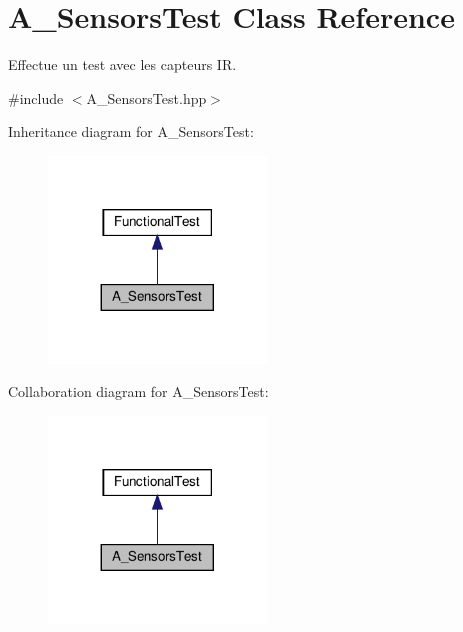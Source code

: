 \hypertarget{classA__SensorsTest}{}\section{A\+\_\+\+Sensors\+Test Class Reference}
\label{classA__SensorsTest}


Effectue un test avec les capteurs IR.  




{\ttfamily \#include $<$A\+\_\+\+Sensors\+Test.\+hpp$>$}



Inheritance diagram for A\+\_\+\+Sensors\+Test\+:
\nopagebreak
\begin{figure}[H]
\begin{center}
\leavevmode
\includegraphics[width=164pt]{classA__SensorsTest__inherit__graph}
\end{center}
\end{figure}


Collaboration diagram for A\+\_\+\+Sensors\+Test\+:
\nopagebreak
\begin{figure}[H]
\begin{center}
\leavevmode
\includegraphics[width=164pt]{classA__SensorsTest__coll__graph}
\end{center}
\end{figure}
